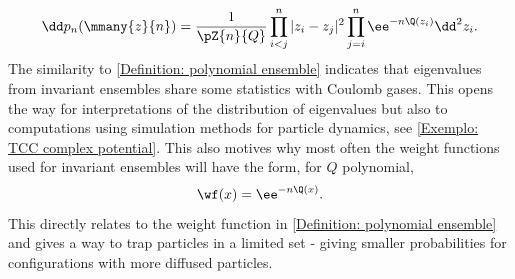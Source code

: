 \begin{equation}
	\dd p_n(\mmany{z}{n}) = \frac{1}{\pZ{n}{Q}}\prod_ {i < j}^n |z_i - z_j|^2 \prod_{j=i}^{n} \ee^{- n \Q(z_i)} \dd^2 z_i.
\end{equation}
The similarity to \autoref{Definition: polynomial ensemble} indicates that eigenvalues from invariant ensembles share some statistics with Coulomb gases. This opens the way for interpretations of the distribution of eigenvalues but also to computations using simulation methods for particle dynamics, see \autoref{Exemplo: TCC complex potential}. This also motives why most often the weight functions used for invariant ensembles will have the form, for $Q$ polynomial,
\begin{equation} \label{Equation: weight funciton form}
	\wf(x) = \ee^{-n \Q(x)}.
\end{equation}
This directly relates to the weight function in \autoref{Definition: polynomial ensemble} and gives a way to trap particles in a limited set - giving smaller probabilities for configurations with more diffused particles.

